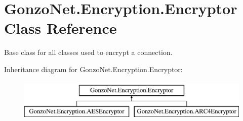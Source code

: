 \hypertarget{class_gonzo_net_1_1_encryption_1_1_encryptor}{\section{Gonzo\+Net.\+Encryption.\+Encryptor Class Reference}
\label{class_gonzo_net_1_1_encryption_1_1_encryptor}
}


Base class for all classes used to encrypt a connection.  


Inheritance diagram for Gonzo\+Net.\+Encryption.\+Encryptor\+:\begin{figure}[H]
\begin{center}
\leavevmode
\includegraphics[height=2.000000cm]{class_gonzo_net_1_1_encryption_1_1_encryptor}
\end{center}
\end{figure}

